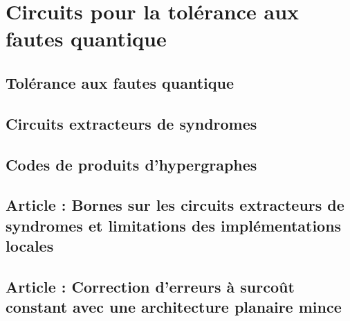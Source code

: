 \begin{comment}
\end{comment}

\chapter{Circuits pour la tolérance aux fautes quantique}

\section{Tolérance aux fautes quantique}

\section{Circuits extracteurs de syndromes}

\section{Codes de produits d'hypergraphes}

\section{Article : Bornes sur les circuits extracteurs de syndromes et limitations des implémentations locales}

\section{Article : Correction d'erreurs à surcoût constant avec une architecture planaire mince}



